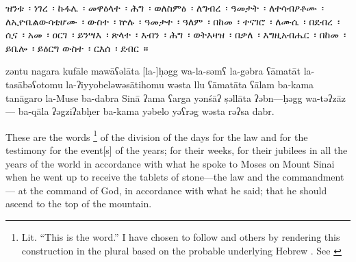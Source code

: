 
\begin{ethiopictext}
        ዝንቱ~፡ ነገረ~፡ ኩፋሌ~፡
        መዋዕላተ~፡ ሕግ~፡ ወለስምዕ~፡
        ለግብረ~፡ ዓመታት~፡ ለተሳብዖቶሙ~፡ 
        ለኢዮቤልውሳቲሆሙ~፡ ውስተ~፡ ኵሉ~፡ ዓመታተ~፡ ዓለም~፡
        በከመ~፡ ተናገሮ~፡ ለሙሴ~፡ በደብረ~፡ ሲና~፡
        አመ~፡ ዐርገ~፡ ይንሣእ~፡ ጽላተ~፡ እብን~፡ ሕግ~፡ ወትእዛዝ~፡ 
        በቃለ~፡ እግዚአብሔር~፡ በከመ~፡ ይቤሎ~፡ ይዕርግ ውስተ~፡ ርእሰ~፡ ደብር~።
\end{ethiopictext}

\begin{transliteration}
        zəntu nagara kufāle
        mawāʕəlāta [la-]ḥəgg wa-la-səmʕ
        la-gəbra ʕāmatāt la-tasābəʕotomu
        la-ʔiyyobeləwəsātihomu wəsta llu ʕāmatāta ʕālam
        ba-kama tanāgaro la-Muse ba-dabra Sinā
        ʔama ʕarga yənśāʔ ṣəllāta ʔəbn---ḥəgg wa-təʔzāz---%
        ba-qāla ʔəgziʔabḥer ba-kama yəbelo yəʕrəg wəsta rəʔsa dabr.
\end{transliteration}

\begin{translation}
        These are the words%
        \footnote{Lit. ``This is the word.'' I have chosen to follow \vanderkam and others by rendering this construction in the plural based on the probable underlying Hebrew . See \cite[125]{vanderkam2018}}
        of the division 
        of the days for the law and for the testimony
        for the event[s] of the years; for their weeks,
        for their jubilees in all the years of the world
        in accordance with what he spoke to Moses on Mount Sinai 
        when he went up to receive the tablets of stone---the law and the commandment---%
        at the command of God, in accordance with what he said;
        that he should ascend to the top of the mountain.
\end{translation}
